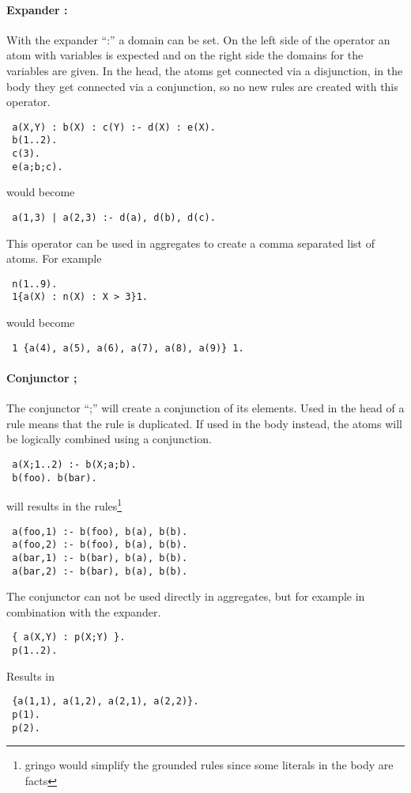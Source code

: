 \documentclass[a4paper,10pt]{article}
\begin{document}
\paragraph{Expander :}
With the expander ``:'' a domain can be set.
On the left side of the operator an atom with variables is expected and on the right side the domains for the variables are given.
In the head, the atoms get connected via a disjunction, in the body they get connected via a conjunction, so no new rules are created with this operator.
\begin{verbatim}
 a(X,Y) : b(X) : c(Y) :- d(X) : e(X).
 b(1..2).
 c(3).
 e(a;b;c).
\end{verbatim}
would become
\begin{verbatim}
 a(1,3) | a(2,3) :- d(a), d(b), d(c).
\end{verbatim}
This operator can be used in aggregates to create a comma separated list of atoms.
For example
\begin{verbatim}
 n(1..9).
 1{a(X) : n(X) : X > 3}1.
\end{verbatim}
would become
\begin{verbatim}
 1 {a(4), a(5), a(6), a(7), a(8), a(9)} 1.
\end{verbatim}

\paragraph{Conjunctor ;}
The conjunctor ``;'' will create a conjunction of its elements.
Used in the head of a rule means that the rule is duplicated.
If used in the body instead, the atoms will be logically combined using a conjunction.
\begin{verbatim}
 a(X;1..2) :- b(X;a;b).
 b(foo). b(bar).
\end{verbatim}
will results in the rules\footnote{gringo would simplify the grounded rules since some literals in the body are facts}
\begin{verbatim}
 a(foo,1) :- b(foo), b(a), b(b).
 a(foo,2) :- b(foo), b(a), b(b).
 a(bar,1) :- b(bar), b(a), b(b).
 a(bar,2) :- b(bar), b(a), b(b).
\end{verbatim}
The conjunctor can not be used directly in aggregates, but for example in combination with the expander.
\begin{verbatim}
 { a(X,Y) : p(X;Y) }.
 p(1..2).
\end{verbatim}
Results in
\begin{verbatim}
 {a(1,1), a(1,2), a(2,1), a(2,2)}.
 p(1).
 p(2).
\end{verbatim}
\end{document}
